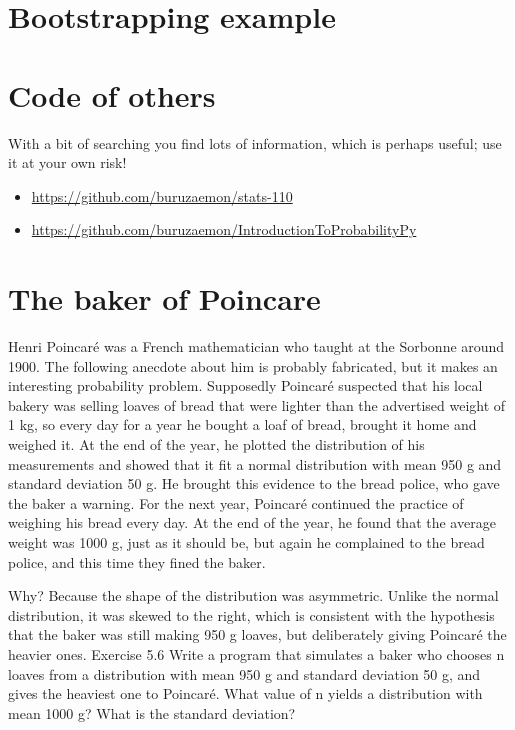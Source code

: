 \documentclass[a4paper]{article}
\begin{document}
\section{Bootstrapping example}
\label{sec:org6006a3a}

\section{Code of others}
\label{sec:org9764e8d}

With a bit of searching you find lots of information, which is perhaps  useful;  use it at your own risk!

\begin{itemize}
\item \url{https://github.com/buruzaemon/stats-110}
\item \url{https://github.com/buruzaemon/IntroductionToProbabilityPy}
\end{itemize}




\section{The baker of Poincare}
\label{sec:org94bc890}


Henri Poincaré was a French mathematician who taught at the Sorbonne around 1900. The following anecdote about him is probably fabricated, but it makes an interesting probability problem.
Supposedly Poincaré suspected that his local bakery was selling loaves of bread that were lighter than the advertised weight of 1 kg, so every day for a year he bought a loaf of bread, brought it home and weighed it. At the end of the year, he plotted the distribution of his measurements and showed that it fit a normal distribution with mean 950 g and standard deviation 50 g. He brought this evidence to the bread police, who gave the baker a warning.
For the next year, Poincaré continued the practice of weighing his bread every day. At the end of the year, he found that the average weight was 1000 g, just as it should be, but again he complained to the bread police, and this time they fined the baker.


Why? Because the shape of the distribution was asymmetric. Unlike the normal distribution, it was skewed to the right, which is consistent with the hypothesis that the baker was still making 950 g loaves, but deliberately giving Poincaré the heavier ones.
Exercise 5.6 Write a program that simulates a baker who chooses n loaves from a distribution with mean 950 g and standard deviation 50 g, and gives the heaviest one to Poincaré. What value of n yields a distribution with mean 1000 g? What is the standard deviation?
\end{document}
